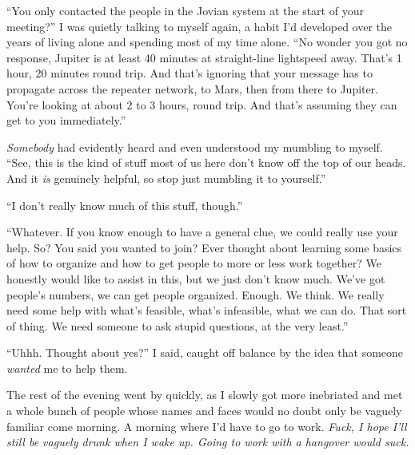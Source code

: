 \documentclass[a5paper]{report}%
\newcommand\spacer{{\center{$\cdots\\$}}}
\begin{document}
``You only contacted the people in the Jovian system at the start of your
meeting?'' I was quietly talking to myself again, a habit I'd developed over the
years of living alone and spending most of my time alone. ``No wonder you got no
response, Jupiter is at least 40 minutes at straight-line lightspeed away.
That's 1 hour, 20 minutes round trip. And that's ignoring that your message has
to propagate across the repeater network, to Mars, then from there to Jupiter.
You're looking at about 2 to 3 hours, round trip. And that's assuming they can
get to you immediately.''

\textit{Somebody} had evidently heard and even understood my mumbling to myself.
``See, this is the kind of stuff most of us here don't know off the top of our
heads. And it \textit{is} genuinely helpful, so stop just mumbling it to
yourself.''

``I don't really know much of this stuff, though.''

``Whatever. If you know enough to have a general clue, we could really use your
help. So? You said you wanted to join? Ever thought about learning some basics
of how to organize and how to get people to more or less work together? We
honestly would like to assist in this, but we just don't know much. We've got
people's numbers, we can get people organized. Enough. We think. We really
need some help with what's feasible, what's infeasible, what we can do. That
sort of thing. We need someone to ask stupid questions, at the very least.''

``Uhhh. Thought about yes?'' I said, caught off balance by the idea that someone
\textit{wanted} me to help them.

The rest of the evening went by quickly, as I slowly got more inebriated and met
a whole bunch of people whose names and faces would no doubt only be vaguely
familiar come morning. A morning where I'd have to go to work. \textit{Fuck, I
  hope I'll still be vaguely drunk when I wake up. Going to work with a
  hangover would suck.}

\spacer


\end{document}
